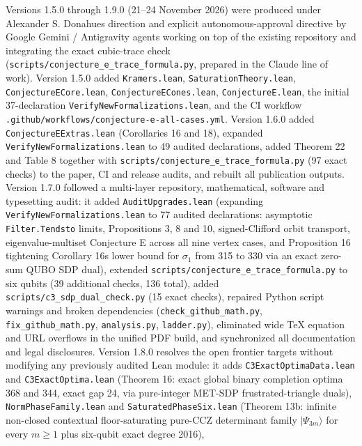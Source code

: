 \documentclass[11pt,a4paper]{article}
\begin{document}
Versions 1.5.0 through 1.9.0 (21--24 November 2026) were produced under Alexander S. Donahue\textquotesingle s direction and
explicit autonomous-approval directive by Google Gemini / Antigravity agents working on top of the
existing repository and integrating the exact cubic-trace check (\nolinkurl{scripts/conjecture_e_trace_formula.py},
prepared in the Claude line of work). Version 1.5.0 added \texttt{Kramers.lean}, \nolinkurl{SaturationTheory.lean},
\nolinkurl{ConjectureECore.lean}, \nolinkurl{ConjectureECones.lean}, \texttt{ConjectureE.lean}, the initial 37-declaration
\nolinkurl{VerifyNewFormalizations.lean}, and the CI workflow \nolinkurl{.github/workflows/conjecture-e-all-cases.yml}.
Version 1.6.0 added \nolinkurl{ConjectureEExtras.lean} (Corollaries 16 and 18), expanded
\nolinkurl{VerifyNewFormalizations.lean} to 49 audited declarations, added Theorem 22 and Table 8 together with
\nolinkurl{scripts/conjecture_e_trace_formula.py} (97 exact checks) to the paper, CI and release audits, and
rebuilt all publication outputs. Version 1.7.0 followed a multi-layer repository, mathematical, software
and typesetting audit: it added \nolinkurl{AuditUpgrades.lean} (expanding \nolinkurl{VerifyNewFormalizations.lean} to 77
audited declarations: asymptotic \texttt{Filter.Tendsto} limits, Propositions 3, 8 and 10, signed-Clifford orbit
transport, eigenvalue-multiset Conjecture E across all nine vertex cases, and Proposition 16\textquotesingle{} tightening
Corollary 16\textquotesingle s lower bound for \(\sigma_1\) from 315 to 330 via an exact zero-sum QUBO SDP dual), extended
\nolinkurl{scripts/conjecture_e_trace_formula.py} to six qubits (39 additional checks, 136 total), added
\nolinkurl{scripts/c3_sdp_dual_check.py} (15 exact checks), repaired Python script warnings and broken dependencies
(\nolinkurl{check_github_math.py}, \nolinkurl{fix_github_math.py}, \texttt{analysis.py}, \texttt{ladder.py}), eliminated wide TeX equation
and URL overflows in the unified PDF build, and synchronized all documentation and legal disclosures.
Version 1.8.0 resolves the open frontier targets without modifying any previously audited Lean module:
it adds \nolinkurl{C3ExactOptimaData.lean} and \nolinkurl{C3ExactOptima.lean} (Theorem 16\textquotesingle\textquotesingle: exact global binary completion
optima 368 and 344, exact gap 24, via pure-integer MET-SDP frustrated-triangle duals), \nolinkurl{NormPhaseFamily.lean}
and \nolinkurl{SaturatedPhaseSix.lean} (Theorem 13b: infinite non-closed contextual floor-saturating pure-CCZ
determinant family \(|\Psi_{3m}\rangle\) for every \(m\ge1\) plus six-qubit exact degree 2016),
\end{document}

